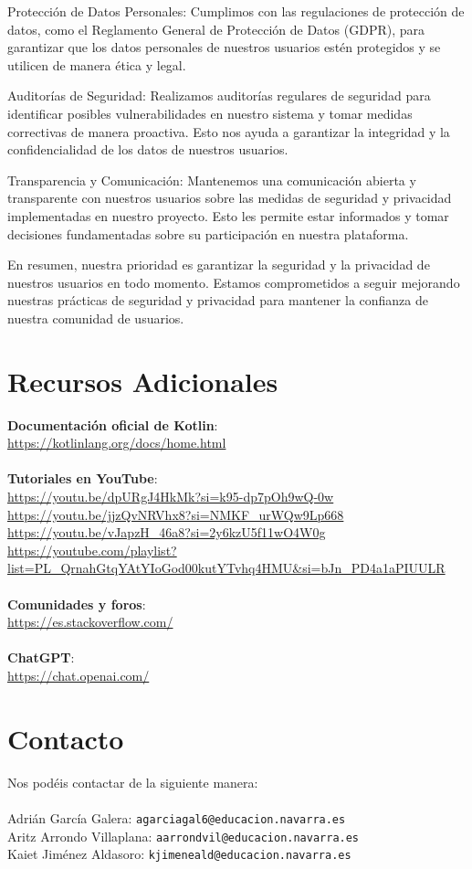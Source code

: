 \documentclass{article}
\begin{document}
    Protección de Datos Personales: Cumplimos con las regulaciones de protección de datos, como el Reglamento General de Protección de Datos (GDPR), para garantizar que los datos personales de nuestros usuarios estén protegidos y se utilicen de manera ética y legal.

    Auditorías de Seguridad: Realizamos auditorías regulares de seguridad para identificar posibles vulnerabilidades en nuestro sistema y tomar medidas correctivas de manera proactiva. Esto nos ayuda a garantizar la integridad y la confidencialidad de los datos de nuestros usuarios.

    Transparencia y Comunicación: Mantenemos una comunicación abierta y transparente con nuestros usuarios sobre las medidas de seguridad y privacidad implementadas en nuestro proyecto. Esto les permite estar informados y tomar decisiones fundamentadas sobre su participación en nuestra plataforma.

En resumen, nuestra prioridad es garantizar la seguridad y la privacidad de nuestros usuarios en todo momento. Estamos comprometidos a seguir mejorando nuestras prácticas de seguridad y privacidad para mantener la confianza de nuestra comunidad de usuarios.

\section{Recursos Adicionales}

\textbf{Documentación oficial de Kotlin}: \\
\url{https://kotlinlang.org/docs/home.html} \\
\\
\textbf{Tutoriales en YouTube}: \\
\url{https://youtu.be/dpURgJ4HkMk?si=k95-dp7pOh9wQ-0w} \\
\url{https://youtu.be/jjzQvNRVhx8?si=NMKF_urWQw9Lp668} \\
\url{https://youtu.be/vJapzH_46a8?si=2y6kzU5f11wO4W0g} \\
\url{https://youtube.com/playlist?list=PL_QrnahGtqYAtYIoGod00kutYTvhq4HMU&si=bJn_PD4a1aPIUULR} \\
\\
\textbf{Comunidades y foros}: \\
\url{https://es.stackoverflow.com/} \\
\\
\textbf{ChatGPT}: \\
\url{https://chat.openai.com/}

\section{Contacto}

Nos podéis contactar de la siguiente manera:
\\
\\
Adrián García Galera: \texttt{agarciagal6@educacion.navarra.es} \\
Aritz Arrondo Villaplana: \texttt{aarrondvil@educacion.navarra.es} \\
Kaiet Jiménez Aldasoro: \texttt{kjimeneald@educacion.navarra.es}
\end{document}

